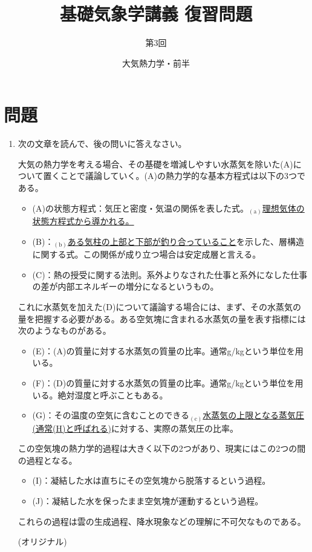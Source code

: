 \documentclass{jsarticle}
\newenvironment{problems}
{
  \renewcommand\labelenumi{\doublebox{\arabic{enumi}}}
  \begin{enumerate}
}{
  \end{enumerate}
  \renewcommand\labelenumi{\arabic{enumi}.}
}
\begin{document}
\title{基礎気象学講義 復習問題} %
\author{第3回} %
\date{大気熱力学・前半} %
\maketitle

\section{問題}

    \begin{problems}
    \item 次の文章を読んで、後の問いに答えなさい。
        \begin{screen}
          大気の熱力学を考える場合、その基礎を増減しやすい水蒸気を除いた(A)について置くことで議論していく。(A)の熱力学的な基本方程式は以下の3つである。
          \begin{itemize}
          \item (A)の状態方程式：気圧と密度・気温の関係を表した式。$_{(\mathrm{a})}$\underline{理想気体の状態方程式から導かれる。}
          \item (B)：$_{(\mathrm{b})}$\underline{ある気柱の上部と下部が釣り合っていること}を示した、層構造に関する式。この関係が成り立つ場合は安定成層と言える。
          \item (C)：熱の授受に関する法則。系外よりなされた仕事と系外になした仕事の差が内部エネルギーの増分になるというもの。
          \end{itemize}
          これに水蒸気を加えた(D)について議論する場合には、まず、その水蒸気の量を把握する必要がある。ある空気塊に含まれる水蒸気の量を表す指標には次のようなものがある。
          \begin{itemize}
          \item (E)：(A)の質量に対する水蒸気の質量の比率。通常g/kgという単位を用いる。
          \item (F)：(D)の質量に対する水蒸気の質量の比率。通常g/kgという単位を用いる。絶対湿度と呼ぶこともある。
          \item (G)：その温度の空気に含むことのできる$_{(\mathrm{c})}$\underline{水蒸気の上限となる蒸気圧(通常(H)と呼ばれる)}に対する、実際の蒸気圧の比率。
          \end{itemize}
          この空気塊の熱力学的過程は大きく以下の2つがあり、現実にはこの2つの間の過程となる。
          \begin{itemize}
          \item (I)：凝結した水は直ちにその空気塊から脱落するという過程。
          \item (J)：凝結した水を保ったまま空気塊が運動するという過程。
          \end{itemize}
          これらの過程は雲の生成過程、降水現象などの理解に不可欠なものである。
            \begin{flushright}
            (オリジナル)
            \end{flushright}
        \end{screen}


\end{problems}
\end{document}
